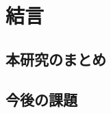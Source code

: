 \documentclass[./main]{subfiles}
\begin{document}
  
\section{結言}
\label{sec: conclusion}

\subsection{本研究のまとめ}
\label{subsec: conclusion-summary}

\subsection{今後の課題}
\label{subsec: conclusion-future_tasks}

\biblio
\end{document}
